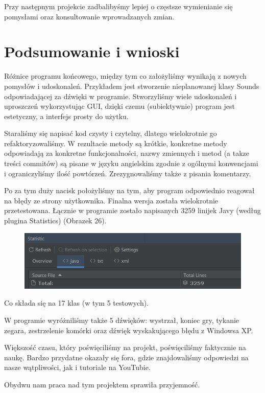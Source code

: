\documentclass{article}
\begin{document}
Przy następnym projekcie zadbalibyśmy lepiej o częstsze wymienianie się pomysłami oraz konsultowanie wprowadzanych zmian.

\section{Podsumowanie i wnioski}
Różnice programu końcowego, między tym co założyliśmy wynikają z nowych pomysłów i udoskonaleń. Przykładem jest stworzenie nieplanowanej klasy Sounds odpowiadającej za dźwięki w programie. Stworzyliśmy wiele udoskonaleń i uproszczeń wykorzystując GUI, dzięki czemu (subiektywnie) program jest estetyczny, a interfejs prosty do użytku.

Staraliśmy się napisać kod czysty i czytelny, dlatego wielokrotnie go refaktoryzowaliśmy. W rezultacie metody są krótkie, konkretne metody odpowiadają za konkretne funkcjonalności, nazwy zmiennych i metod (a takze treści commitów) są pisane  w języku angielskim zgodnie z ogólnymi konwencjami i ograniczyliśmy ilość powtórzeń. Zrezygnowaliśmy także z pisania komentarzy.

Po za tym duży nacisk położyliśmy na tym, aby program odpowiednio reagował na błędy ze strony użytkownika. Finalna wersja została wielokrotnie przetestowana.
Łącznie w programie zostało napisanych 3259 linijek Javy (według plugina Statistics) (Obrazek 26).
\begin{figure} [hbt!]
    \centering
    \includegraphics[width=12cm]{statystyki.png}
\end{figure}
Co składa się na 17 klas (w tym 5 testowych).

W programie wyróżniliśmy także 5 dźwięków: wystrzał, koniec gry, tykanie zegara, zestrzelenie komórki oraz dźwięk wyskakującego błędu z Windowsa XP.

Większość czasu, który poświęciliśmy na projekt, poświęciliśmy faktycznie na naukę. Bardzo przydatne okazały się fora, gdzie znajdowaliśmy odpowiedzi na nasze wątpliwości, jak i tutoriale na YouTubie.

Obydwu nam praca nad tym projektem sprawiła przyjemność.
\end{document}
